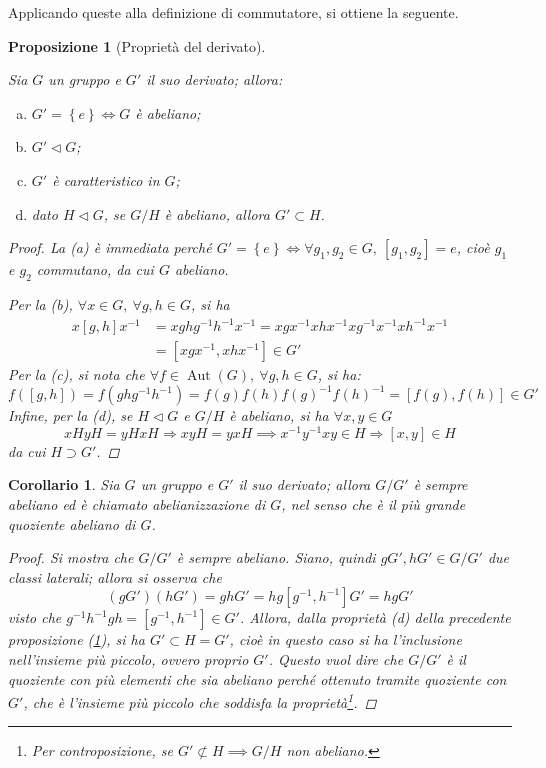 \documentclass[11pt]{scrartcl}
\theoremstyle{style1}
\newtheorem{prop}{Proposizione}[section]
\newtheorem{corollario}{Corollario}[teorema]
\numberwithin{equation}{subsection}
\begin{document}
Applicando queste alla definizione di commutatore, si ottiene la seguente.
\begin{prop}[Propriet\`a del derivato]\label{propderiv}
	
	Sia $G$ un gruppo e $G'$ il suo derivato; allora:
	\begin{enumerate}[(a).]
		\item $G ' = \left\{ e \right\}  \iff G$ \`e abeliano;
		\item $G' \lhd G$;
		\item $G'$ \`e caratteristico in $G$;
		\item dato $H \lhd G$, se $G / H$ \`e abeliano, allora $G' \subset H$.
	\end{enumerate}
	\begin{proof}
		La (a) \`e immediata perch\'e $G' = \left\{ e \right\} \iff \forall g_1,g_2 \in G, \ [g_1,g_2] = e $, cio\`e $g_1$ e $g_2$ commutano, da cui $G$ abeliano.

		Per la (b), $\forall x \in G, \ \forall g,h \in G $, si ha 
		\[
			\begin{split}
				x[g,h]x^{-1}  &= xghg^{-1}h^{-1}x^{-1}= xgx^{-1}xhx^{-1}xg^{-1}x^{-1}xh^{-1}x^{-1}\\
					      &=[xgx^{-1}, xhx^{-1}] \in G'
			\end{split}
		\] 
	Per la (c), si nota che $\forall f \in \operatorname{Aut} (G), \ \forall g,h \in G$, si ha:
	\[
		f([g,h]) = f(ghg^{-1}h^{-1}) = f(g) f(h) f(g)^{-1} f(h)^{-1} = [f(g), f(h)] \in G'
	\] 
	Infine, per la (d), se $H \lhd G$ e $G / H$ \`e abeliano, si ha $\forall x,y \in G$
	\[
		xHyH =yH xH\Rightarrow xyH = yxH \implies x^{-1}y^{-1}xy \in H \Rightarrow [x,y] \in H
	\] 
	da cui $H \supset G' $.
	\end{proof}
\end{prop}
\begin{corollario}
	Sia $G$ un gruppo e $G'$ il suo derivato; allora $G / G'$ \`e sempre abeliano ed \`e chiamato \textit{abelianizzazione} di $G$, nel senso che \`e il pi\`u grande quoziente abeliano di $G$.
	\begin{proof}
		Si mostra che $G / G'$ \`e sempre abeliano. 
		Siano, quindi $gG', hG' \in G / G'$ due classi laterali; allora si osserva che
		\[
			(gG') (hG') = ghG' = hg [g^{-1},h^{-1}] G' = hg G'
		\] 
		visto che $g^{-1}h^{-1}gh=[g^{-1},h^{-1}] \in G'$.
		Allora, dalla propriet\`a (d) della precedente proposizione (\ref{propderiv}), si ha $G' \subset H =G'$, cio\`e in questo caso si ha l'inclusione nell'insieme pi\`u piccolo, ovvero proprio $G'$. 
		Questo vuol dire che $G /G'$ \`e il quoziente con pi\`u elementi che sia abeliano perch\'e ottenuto tramite quoziente con $G'$, che \`e l'insieme pi\`u piccolo che soddisfa la propriet\`a\footnote{Per controposizione, se $G'\not\subset H\implies G/H$ non abeliano.}.
	\end{proof}
\end{corollario}
\end{document}
